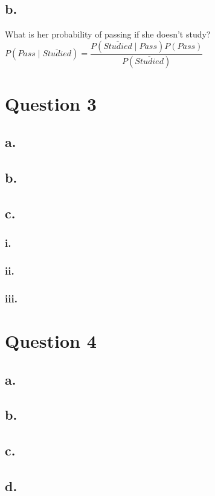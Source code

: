 \documentclass[12pt]{article}
\begin{document}
\subsection*{b.}

What is her probability of passing if she doesn't study? \\

$P(Pass \mid \overline{Studied}) = \dfrac{P(\overline{Studied} \mid Pass)P(Pass)}{P(\overline{Studied})}$



\newpage
\section*{Question 3}

\subsection*{a.}
\subsection*{b.}
\subsection*{c.}
\subsubsection*{i.}
\subsubsection*{ii.}
\subsubsection*{iii.}

\newpage
\section*{Question 4}

\subsection*{a.} 
\subsection*{b.}
\subsection*{c.}
\subsection*{d.}
    
\end{document}

